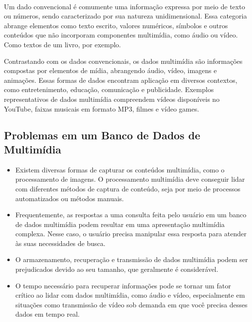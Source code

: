 \documentclass[12pt]{article}
\begin{document}
	\paragraph{} Um dado convencional é comumente uma informação expressa por meio de texto ou números, sendo caracterizado por sua natureza unidimensional. Essa categoria abrange elementos como texto escrito, valores numéricos, símbolos e outros conteúdos que não incorporam componentes multimídia, como áudio ou vídeo. Como textos de um livro, por exemplo.
	
	
	Contrastando com os dados convencionais, os dados multimídia são informações compostas por elementos de mídia, abrangendo áudio, vídeo, imagens e animações. Essas formas de dados encontram aplicação em diversos contextos, como entretenimento, educação, comunicação e publicidade. Exemplos representativos de dados multimídia compreendem vídeos disponíveis no YouTube, faixas musicais em formato MP3, filmes e vídeo games.
	
	\subsection{Problemas em um Banco de Dados de Multimídia}
	\begin{itemize}
		\item Existem diversas formas de capturar os conteúdos multimídia, como o processamento de imagens. O processamento multimídia deve conseguir lidar com diferentes métodos de captura de conteúdo, seja por meio de processos automatizados ou métodos manuais.
		
		\item  Frequentemente, as respostas a uma consulta feita pelo usuário em um banco de dados multimídia podem resultar em uma apresentação multimídia complexa. Nesse caso, o usuário precisa manipular essa resposta para atender às suas necessidades de busca.
		
		\item O armazenamento, recuperação e transmissão de dados multimídia podem ser prejudicados devido ao seu tamanho, que geralmente é considerável.
		
		\item O tempo necessário para recuperar informações pode se tornar um fator crítico ao lidar com dados multimídia, como áudio e vídeo, especialmente em situações como transmissão de vídeo sob demanda em que você precisa desses dados em tempo real.
	\end{itemize}
	
\end{document}
